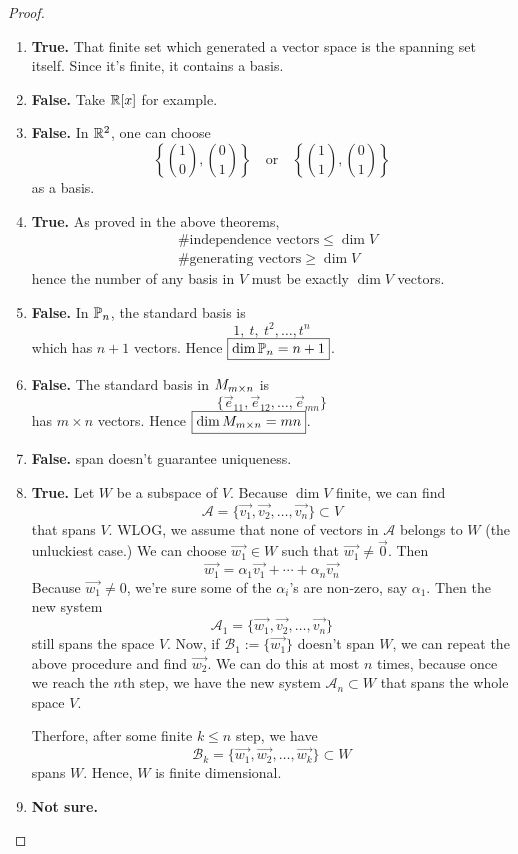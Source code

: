 \begin{proof}
  \begin{enumerate}
    \item \textbf{True.} That finite set which generated a vector space
      is the spanning set itself. Since it's finite, it contains a
      basis.
    \item \textbf{False.} Take $\R[x]$ for example.
    \item \textbf{False.} In $\R^2$, one can choose 
      \[
        \left\{\binom{1}{0}, \binom{0}{1}\right\}
        \quad\text{or}\quad
        \left\{\binom{1}{1}, \binom{0}{1}\right\}
      \]
      as a basis.
    \item \textbf{True.} As proved in the above theorems,
      \begin{align*}
        &\text{\# independence vectors}\leq \dim V\\
        &\text{\# generating vectors}\geq \dim V
      \end{align*}
      hence the number of any basis in $V$ must be exactly $\dim V$ vectors.
    \item \textbf{False.} In $\P_n$, the standard basis is
      \[
        1,~t,~t^2,\dots,t^n
      \]
      which has $n+1$ vectors. Hence $\boxed{\dim\P_n=n+1}$.
    \item \textbf{False.} The standard basis in $M_{m\by n}$ is
      \[
        \{\vec{e}_{11},\vec{e}_{12},\dots,\vec{e}_{mn}\}
      \]
      has $m\times n$ vectors. Hence $\boxed{\dim M_{m\by n}=mn}$.
    \item \textbf{False.} span doesn't guarantee uniqueness.
    \item \textbf{True.} Let $W$ be a subspace of $V$. Because $\dim V$
      finite, we can find 
      $$\mathcal{A}=\{\vec{v_1},\vec{v_2},\dots,\vec{v_n}\}\subset V$$
      that spans $V$. WLOG, we assume that none of vectors in $\mathcal{A}$
      belongs to $W$ (the unluckiest case.) We can choose 
      $\vec{w_1}\in W$ such that $\vec{w_1}\neq\vec{0}$. Then
      \[
        \vec{w_1}=\alpha_1\vec{v_1}+\cdots+\alpha_n\vec{v_n}
      \]
      Because $\vec{w_1}\neq 0$, we're sure some of the $\alpha_i$'s are
      non-zero, say $\alpha_1$. Then the new system
      \[
        \mathcal{A}_1=\{\vec{w_1},\vec{v_2},\dots,\vec{v_n}\}
      \]
      still spans the space $V$. Now, if $\mathcal{B}_1:=\{\vec{w_1}\}$
      doesn't span $W$, we can repeat the above procedure and find 
      $\vec{w_2}$. We can do this at most $n$ times, because once
      we reach the $n$th step, we have the new system 
      $\mathcal{A}_n\subset W$ that spans the whole space $V$.

      Therfore, after some finite $k\le n$ step, we have
      \[
        \mathcal{B}_k=\{\vec{w_1},\vec{w_2},\dots,\vec{w_k}\}\subset W
      \]
      spans $W$. Hence, $W$ is finite dimensional.
    \item \textbf{Not sure.}
  \end{enumerate}
\end{proof}
